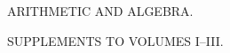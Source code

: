 \thispagestyle{empty}
\vspace*{12em}
\begin{center}
{\Large ARITHMETIC AND ALGEBRA.\par}
\vspace{2em}
SUPPLEMENTS TO VOLUMES I--III.
\end{center}
\clearpage

